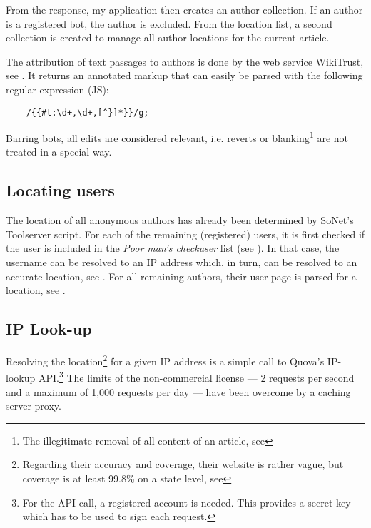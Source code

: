 From the response, my application then creates an author collection.
If an author is a registered bot, the author is excluded.
From the location list, a second collection is created to manage all author locations for the current article. 

The attribution of text passages to authors is done by the web service WikiTrust, see . 
It returns an annotated markup that can easily be parsed with the following regular expression (JS):

\lstset{caption=,label=wikitrustre,language=HTML,numbers=none}
\begin{lstlisting}
	/{{#t:\d+,\d+,[^}]*}}/g;
\end{lstlisting}

Barring bots, all edits are considered relevant, i.e. reverts or blanking\footnote{The illegitimate removal of all content of an article, see } are not treated in a special way.


\subsection{Locating users}

The location of all anonymous authors has already been determined by SoNet's Toolserver script.
For each of the remaining (registered) users, it is first checked if the user is included in the \emph{Poor man's checkuser} list (see ).
In that case, the username can be resolved to an \ac{IP} address which, in turn, can be resolved to an accurate location, see .
For all remaining authors, their user page is parsed for a location, see .


\subsection{IP Look-up}\label{sub:iplookup}

Resolving the location\footnote{Regarding their accuracy and coverage, their website is rather vague, but coverage is at least 99.8\% on a state level, see } for a given \ac{IP} address is a simple call to Quova's IP-lookup \ac{API}.\footnote{For the \ac{API} call, a registered account is needed. This provides a secret key which has to be used to sign each request.}
The limits of the non-commercial license --- 2 requests per second and a maximum of 1,000 requests per day --- have been overcome by a caching server proxy.


